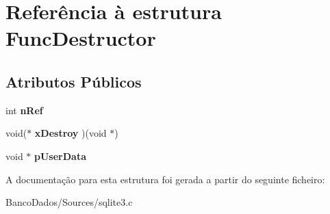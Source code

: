 \hypertarget{struct_func_destructor}{\section{Referência à estrutura Func\-Destructor}
\label{struct_func_destructor}
}
\subsection*{Atributos Públicos}
\begin{DoxyCompactItemize}
\item 
\hypertarget{struct_func_destructor_a8b1bf3af00c88400efc1dd74a4410463}{int {\bfseries n\-Ref}}\label{struct_func_destructor_a8b1bf3af00c88400efc1dd74a4410463}

\item 
\hypertarget{struct_func_destructor_a8d688d51ad881306c81b3f8d4795e076}{void($\ast$ {\bfseries x\-Destroy} )(void $\ast$)}\label{struct_func_destructor_a8d688d51ad881306c81b3f8d4795e076}

\item 
\hypertarget{struct_func_destructor_a181875609f0f8221985cd6cfd7ad8cd8}{void $\ast$ {\bfseries p\-User\-Data}}\label{struct_func_destructor_a181875609f0f8221985cd6cfd7ad8cd8}

\end{DoxyCompactItemize}


A documentação para esta estrutura foi gerada a partir do seguinte ficheiro\-:\begin{DoxyCompactItemize}
\item 
Banco\-Dados/\-Sources/sqlite3.\-c\end{DoxyCompactItemize}

